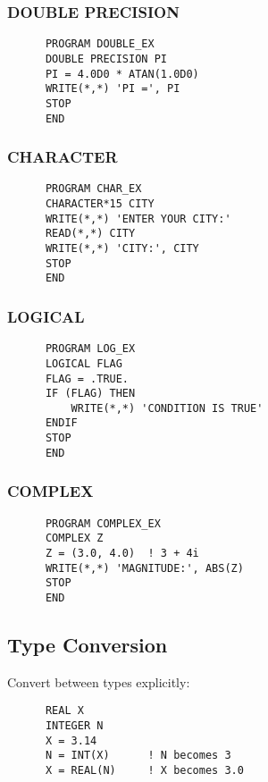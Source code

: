 \documentclass{book}
\begin{document}
\subsubsection*{DOUBLE PRECISION}
\begin{verbatim}
      PROGRAM DOUBLE_EX
      DOUBLE PRECISION PI
      PI = 4.0D0 * ATAN(1.0D0)
      WRITE(*,*) 'PI =', PI
      STOP
      END
\end{verbatim}

\subsubsection*{CHARACTER}
\begin{verbatim}
      PROGRAM CHAR_EX
      CHARACTER*15 CITY
      WRITE(*,*) 'ENTER YOUR CITY:'
      READ(*,*) CITY
      WRITE(*,*) 'CITY:', CITY
      STOP
      END
\end{verbatim}

\subsubsection*{LOGICAL}
\begin{verbatim}
      PROGRAM LOG_EX
      LOGICAL FLAG
      FLAG = .TRUE.
      IF (FLAG) THEN
          WRITE(*,*) 'CONDITION IS TRUE'
      ENDIF
      STOP
      END
\end{verbatim}

\subsubsection*{COMPLEX}
\begin{verbatim}
      PROGRAM COMPLEX_EX
      COMPLEX Z
      Z = (3.0, 4.0)  ! 3 + 4i
      WRITE(*,*) 'MAGNITUDE:', ABS(Z)
      STOP
      END
\end{verbatim}

\subsection*{Type Conversion}
Convert between types explicitly:
\begin{verbatim}
      REAL X
      INTEGER N
      X = 3.14
      N = INT(X)      ! N becomes 3
      X = REAL(N)     ! X becomes 3.0
\end{verbatim}
\end{document}
